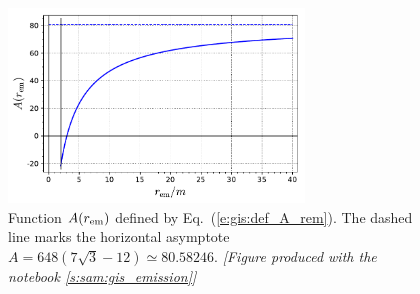 \begin{figure}
\centerline{\includegraphics[width=0.7\textwidth]{gis_A_rem.pdf}}
\caption[]{\label{f:gis:A_rem} \footnotesize
Function $A(r_{\rm em})$ defined by Eq.~(\ref{e:gis:def_A_rem}).
The dashed line marks the horizontal asymptote $A = 648(7\sqrt{3} - 12) \simeq 80.58246$.
\textsl{[Figure produced with the notebook \ref{s:sam:gis_emission}]}
}
\end{figure}


